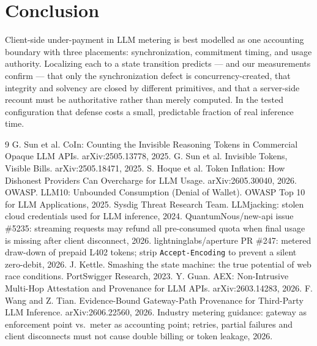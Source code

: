 \documentclass[11pt]{article}
\begin{document}
\section{Conclusion}
Client-side under-payment in LLM metering is best modelled as one accounting boundary
with three placements: synchronization, commitment timing, and usage authority.
Localizing each to a state transition predicts --- and our measurements confirm --- that
only the synchronization defect is concurrency-created, that integrity and solvency are
closed by different primitives, and that a server-side recount must be authoritative
rather than merely computed. In the tested configuration that defense costs a small,
predictable fraction of real inference time.

\begin{thebibliography}{9}\small
{} G. Sun et al. CoIn: Counting the Invisible Reasoning Tokens in Commercial Opaque LLM APIs. arXiv:2505.13778, 2025.
 G. Sun et al. Invisible Tokens, Visible Bills. arXiv:2505.18471, 2025.
 S. Hoque et al. Token Inflation: How Dishonest Providers Can Overcharge for LLM Usage. arXiv:2605.30040, 2026.
 OWASP. LLM10: Unbounded Consumption (Denial of Wallet). OWASP Top 10 for LLM Applications, 2025.
 Sysdig Threat Research Team. LLMjacking: stolen cloud credentials used for LLM inference, 2024.
 QuantumNous/new-api issue \#5235: streaming requests may refund all pre-consumed quota when final usage is missing after client disconnect, 2026.
 lightninglabs/aperture PR \#247: metered draw-down of prepaid L402 tokens; strip \texttt{Accept-Encoding} to prevent a silent zero-debit, 2026.
 J. Kettle. Smashing the state machine: the true potential of web race conditions. PortSwigger Research, 2023.
 Y. Guan. AEX: Non-Intrusive Multi-Hop Attestation and Provenance for LLM APIs. arXiv:2603.14283, 2026.
 F. Wang and Z. Tian. Evidence-Bound Gateway-Path Provenance for Third-Party LLM Inference. arXiv:2606.22560, 2026.
 Industry metering guidance: gateway as enforcement point vs.\ meter as accounting point; retries, partial failures and client disconnects must not cause double billing or token leakage, 2026.
\end{thebibliography}
\end{document}
